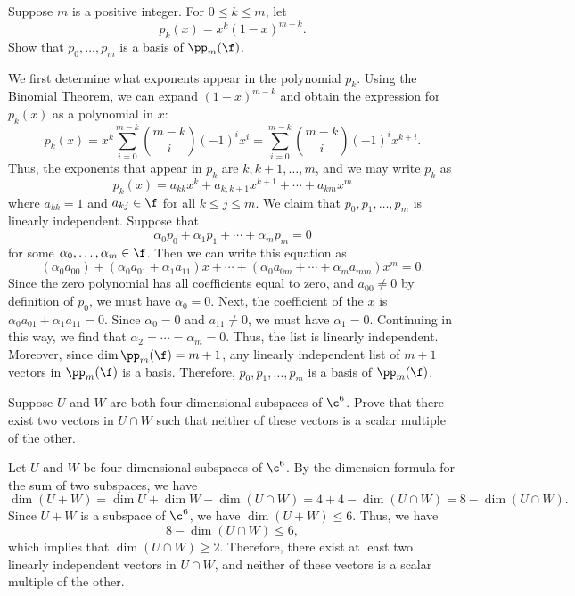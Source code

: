 \begin{exercise}[2c10]
    Suppose $m$ is a positive integer. For $0 \leq k \leq m$, let
    \[p_k(x) = x^k(1 - x)^{m - k}.\]
    Show that $p_0, \ldots, p_m$ is a basis of $\pp_m(\f)$.
\end{exercise}

\begin{sol}
    We first determine what exponents appear in the polynomial $p_k$. Using the Binomial Theorem, we can expand $(1 - x)^{m - k}$ and obtain the expression for $p_k(x)$ as a polynomial in $x$:
    \[p_k(x) = x^k \sum_{i = 0}^{m - k} \binom{m - k}{i} (-1)^i x^i = \sum_{i = 0}^{m - k} \binom{m - k}{i} (-1)^i x^{k + i}.\]
    Thus, the exponents that appear in $p_k$ are $k, k + 1, \ldots, m$, and we may write $p_k$ as
    \[p_k(x) = a_{kk} x^k + a_{k, k + 1} x^{k + 1} + \cdots + a_{km} x^m\]
    where $a_{kk} = 1$ and $a_{kj} \in \f$ for all $k \leq j \leq m$. We claim that $p_0, p_1, \ldots, p_m$ is linearly independent. Suppose that
    \[\alpha_0 p_0 + \alpha_1 p_1 + \cdots + \alpha_m p_m = 0\]
    for some $\alpha_0, \ldots, \alpha_m \in \f$. Then we can write this equation as
    \[(\alpha_0 a_{00}) + (\alpha_0 a_{01} + \alpha_1 a_{11})x + \cdots + (\alpha_0 a_{0m} + \cdots + \alpha_m a_{mm})x^m = 0.\]
    Since the zero polynomial has all coefficients equal to zero, and $a_{00} \neq 0$ by definition of $p_0$, we must have $\alpha_0 = 0$. Next, the coefficient of the $x$ is $\alpha_0 a_{01} + \alpha_1 a_{11} = 0$. Since $\alpha_0 = 0$ and $a_{11} \neq 0$, we must have $\alpha_1 = 0$. Continuing in this way, we find that $\alpha_2 = \cdots = \alpha_m = 0$. Thus, the list is linearly independent. Moreover, since $\dim \pp_m(\f) = m + 1$, any linearly independent list of $m + 1$ vectors in $\pp_m(\f)$ is a basis. Therefore, $p_0, p_1, \ldots, p_m$ is a basis of $\pp_m(\f)$.
\end{sol}

\begin{exercise}[2c11]
    Suppose $U$ and $W$ are both four-dimensional subspaces of $\c^6$. Prove that there exist two vectors in $U \cap W$ such that neither of these vectors is a scalar multiple of the other.
\end{exercise}

\begin{sol}
    Let $U$ and $W$ be four-dimensional subspaces of $\c^6$. By the dimension formula for the sum of two subspaces, we have
    \[\dim(U + W) = \dim U + \dim W - \dim(U \cap W) = 4 + 4 - \dim(U \cap W) = 8 - \dim(U \cap W).\]
    Since $U + W$ is a subspace of $\c^6$, we have $\dim(U + W) \leq 6$. Thus, we have
    \[8 - \dim(U \cap W) \leq 6,\]
    which implies that $\dim(U \cap W) \geq 2$. Therefore, there exist at least two linearly independent vectors in $U \cap W$, and neither of these vectors is a scalar multiple of the other.
\end{sol}

